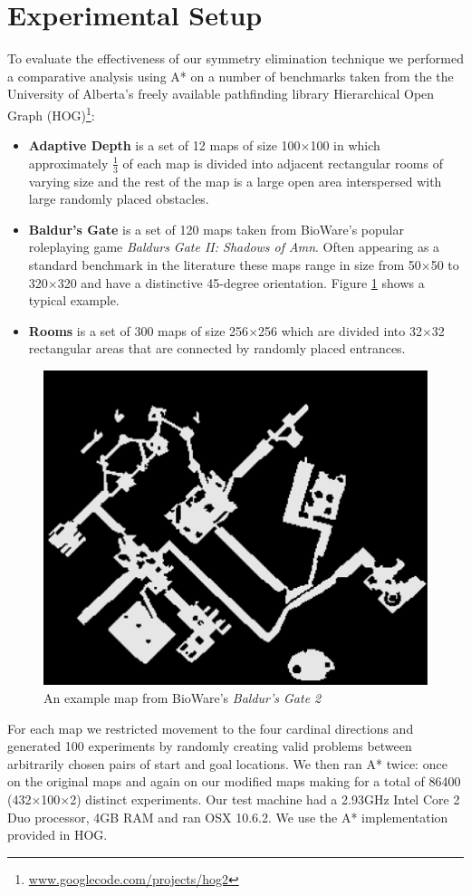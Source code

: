 \section{Experimental Setup}
To evaluate the effectiveness of our symmetry elimination technique we performed
a comparative analysis using A* on a number of benchmarks taken from the
the University of Alberta's freely available pathfinding library 
Hierarchical Open Graph (HOG)\footnote{\url{www.googlecode.com/projects/hog2}}:
\begin{itemize}
\item{\textbf{Adaptive Depth} is a set of 12 maps of size 100$\times$100 in which approximately
$\frac{1}{3}$ of each map is divided into adjacent rectangular rooms of
varying size and the rest of the map is a large open area interspersed with 
large randomly placed obstacles.}
\item{\textbf{Baldur's Gate} is a set of 120 maps taken from BioWare's popular
roleplaying game \emph{Baldurs Gate II: Shadows of Amn}. 
Often appearing as a standard benchmark in the literature 
\cite{botea04,bjornsson05,bjornsson06,sturtevant05,harabor08} these maps range in 
size from 50$\times$50 to 320$\times$320 and have a distinctive 45-degree orientation.
Figure \ref{fig-bgmap} shows a typical example.}
\item{\textbf{Rooms} is a set of 300 maps of size 256$\times$256 which are divided into 32$\times$32
rectangular areas that are connected by randomly placed entrances.}
\end{itemize}

 \begin{figure}[t]
        \begin{center}
                        \includegraphics[width=0.6\columnwidth, trim = 10mm 10mm 10mm 0mm]{diagrams/bgmap.png}
        \end{center}
        \caption{An example map from BioWare's \emph{Baldur's Gate 2}}
        \label{fig-bgmap}
 \end{figure}
\par
For each map we restricted movement to the four cardinal directions and generated 100 experiments by 
randomly creating valid problems between arbitrarily chosen pairs of start and goal locations.
We then ran A* twice: once on the original maps and again on our modified maps making for
a total of 86400 (432$\times$100$\times$2) distinct experiments.
Our test machine had a 2.93GHz Intel Core 2 Duo processor, 4GB RAM and
ran OSX 10.6.2.
We use the A* implementation provided in HOG.
